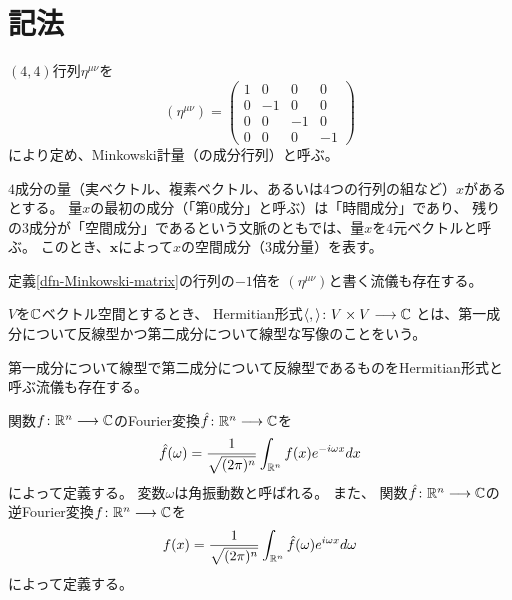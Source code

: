 \section{記法}

\begin{dfn}[Minkowski計量]
  \label{dfn-Minkowski-matrix}
  $(4,4)$行列$\eta^{\mu\nu}$を
  \begin{equation}
    (\eta^{\mu\nu})=
    \begin{pmatrix}
      1 & 0 & 0 & 0 \\
      0 & -1 & 0 & 0 \\
      0 & 0 & -1 & 0 \\
      0 & 0 & 0 & -1
    \end{pmatrix}
  \end{equation}
  により定め、Minkowski計量（の成分行列）と呼ぶ。
\end{dfn}

\begin{dfn}[ベクトル]
  $4$成分の量（実ベクトル、複素ベクトル、あるいは4つの行列の組など）$x$があるとする。
  量$x$の最初の成分（「第$0$成分」と呼ぶ）は「時間成分」であり、
  残りの$3$成分が「空間成分」であるという文脈のともでは、量$x$を$4$元ベクトルと呼ぶ。
  このとき、$\mathbf{x}$によって$x$の空間成分（$3$成分量）を表す。
\end{dfn}

\begin{rem}
  定義\ref{dfn-Minkowski-matrix}の行列の$-1$倍を
  $(\eta^{\mu\nu})$と書く流儀も存在する。
\end{rem}

\begin{dfn}[Hermitian形式]
  $V$を$\mathbb{C}$ベクトル空間とするとき、
  Hermitian形式$\langle,\rangle\colon V\times V \longrightarrow \mathbb{C}$
  とは、第一成分について反線型かつ第二成分について線型な写像のことをいう。
\end{dfn}

\begin{rem}
  第一成分について線型で第二成分について反線型であるものをHermitian形式と呼ぶ流儀も存在する。
\end{rem}

\begin{dfn}[Fourier変換]
  関数$f\colon\mathbb{R}^n\longrightarrow\mathbb{C}$のFourier変換$\hat{f}\colon\mathbb{R}^n\longrightarrow\mathbb{C}$を
  \begin{equation}
    \hat{f}(\omega)=\frac{1}{\sqrt{(2\pi)^n}}\int_{\mathbb{R}^n}f(x)e^{-i\omega x}dx
  \end{equation}
  によって定義する。
  変数$\omega$は角振動数と呼ばれる。
  また、
  関数$\hat{f}\colon\mathbb{R}^n\longrightarrow\mathbb{C}$の逆Fourier変換$f\colon\mathbb{R}^n\longrightarrow\mathbb{C}$を
  \begin{equation}
    f(x)=\frac{1}{\sqrt{(2\pi)^n}}\int_{\mathbb{R}^n}\hat{f}(\omega)e^{i\omega x}d\omega
  \end{equation}
  によって定義する。
\end{dfn}

